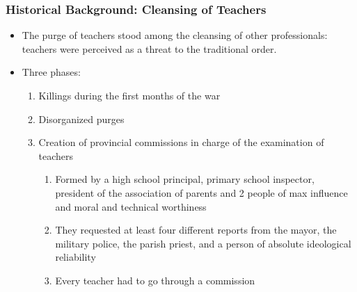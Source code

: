 \documentclass[aspectratio=169]{beamer}
\begin{document}
\begin{frame}
\frametitle{Historical Background:  Cleansing of Teachers}
   
\begin{itemize}
\item The purge of teachers stood among the cleansing of other professionals: teachers were perceived as a threat to the traditional order. %
               \medskip
\pause
\item       Three phases: 
\begin{enumerate}
\medskip
\pause
        \item Killings during the first months of the war\pause
               \medskip
\pause
        \item Disorganized purges
               \medskip
\pause
        \item Creation of provincial commissions in charge of the examination of teachers 
               \begin{enumerate}
                \medskip
                \item Formed by a high school principal, primary school inspector, president of the association of  parents and 2 people of max influence and moral and technical worthiness%
               \item They requested at least four different reports from the mayor, the military police, the parish priest, and a person of absolute ideological reliability
                \item Every teacher had to go through a commission\pause

\end{enumerate}
\end{enumerate}
\end{itemize}
\end{frame}
\end{document}
